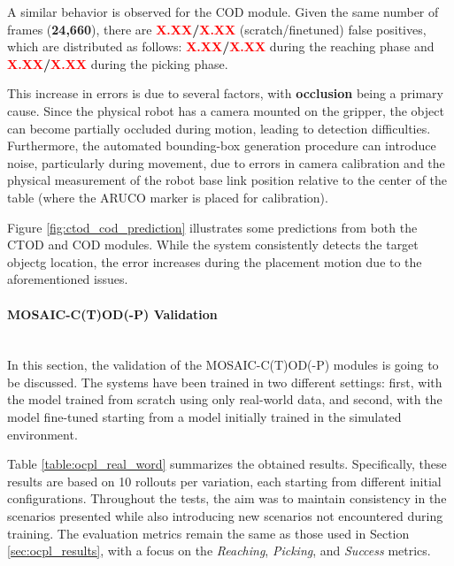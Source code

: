 A similar behavior is observed for the COD module. Given the same number of frames (\textbf{24,660}), there are \textbf{\textcolor{red}{X.XX}/\textcolor{red}{X.XX}} (scratch/finetuned) false positives, which are distributed as follows: \textbf{\textcolor{red}{X.XX}/\textcolor{red}{X.XX}} during the reaching phase and \textbf{\textcolor{red}{X.XX}/\textcolor{red}{X.XX}} during the picking phase.

This increase in errors is due to several factors, with \textbf{occlusion} being a primary cause. Since the physical robot has a camera mounted on the gripper, the object can become partially occluded during motion, leading to detection difficulties. Furthermore, the automated bounding-box generation procedure can introduce noise, particularly during movement, due to errors in camera calibration and the physical measurement of the robot base link position relative to the center of the table (where the ARUCO marker is placed for calibration).

Figure \ref{fig:ctod_cod_prediction} illustrates some predictions from both the CTOD and COD modules. While the system consistently detects the target objectg location, the error increases during the placement motion due to the aforementioned issues.



\paragraph*{MOSAIC-C(T)OD(-P) Validation}\mbox{}\\
In this section, the validation of the MOSAIC-C(T)OD(-P) modules is going to be discussed. The systems have been trained in two different settings: first, with the model trained from scratch using only real-world data, and second, with the model fine-tuned starting from a model initially trained in the simulated environment.

Table \ref{table:ocpl_real_word} summarizes the obtained results. Specifically, these results are based on 10 rollouts per variation, each starting from different initial configurations. Throughout the tests, the aim was to maintain consistency in the scenarios presented while also introducing new scenarios not encountered during training. The evaluation metrics remain the same as those used in Section \ref{sec:ocpl_results}, with a focus on the \textit{Reaching}, \textit{Picking}, and \textit{Success} metrics.



